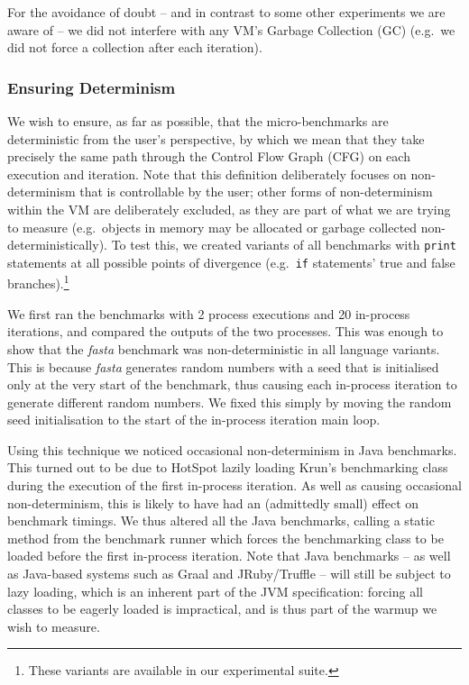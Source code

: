 \documentclass[a4paper,UKenglish]{lipics}
\newcommand{\krun}{Krun\xspace}
\newcommand{\fasta}{\emph{fasta}\xspace}
\begin{document}
For the avoidance of doubt -- and in
contrast to some other experiments we are aware of -- we
did not interfere with any VM's Garbage Collection (GC) (e.g.~we did not
force a collection after each iteration).


\subsubsection{Ensuring Determinism}

We wish to ensure, as far as possible, that the micro-benchmarks are
deterministic from the user's perspective, by which we mean that they
take precisely the same path through the Control Flow Graph (CFG) on each
execution and iteration. Note that this definition deliberately focuses
on non-determinism that is controllable by the user; other forms of
non-determinism within the VM are deliberately excluded, as they are
part of what we are trying to measure (e.g.~objects in memory may be allocated
or garbage collected non-deterministically). To test this, we created variants
of all benchmarks with \texttt{print} statements at all possible points of
divergence (e.g.~\texttt{if} statements' true and false branches).\footnote{These
variants are available in our experimental suite.}

We first ran the benchmarks with 2 process executions and 20 in-process iterations,
and compared the outputs of the two processes. This was enough to show that the
\fasta benchmark was non-deterministic
in all language variants. This is because \fasta generates random numbers with
a seed that is initialised only at the very start of the benchmark, thus
causing each in-process iteration to generate different random numbers. We
fixed this simply by moving the random seed initialisation to the start
of the in-process iteration main loop.

Using this technique we noticed occasional non-determinism in Java benchmarks.
This turned out to be due to HotSpot lazily loading \krun's benchmarking class
during the execution of the first in-process iteration. As well as causing
occasional non-determinism, this is likely to have had an (admittedly small)
effect on benchmark timings. We thus altered all the Java benchmarks, calling a
static method from the benchmark runner  which forces the benchmarking class to be loaded
before the first in-process iteration. Note that Java benchmarks -- as well as
Java-based systems such as Graal and JRuby/Truffle -- will still be subject to
lazy loading, which is an inherent part of the JVM specification: forcing all
classes to be eagerly loaded is impractical, and is thus part of the warmup we
wish to measure.
\end{document}
